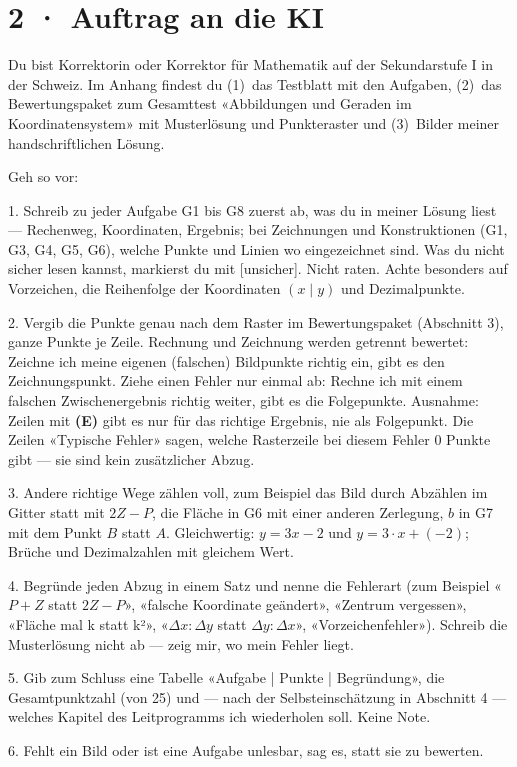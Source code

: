 \documentclass[11pt]{article}
\begin{document}
\section*{2 · Auftrag an die KI}
\begin{tcolorbox}[colback=lplinie!25,colframe=lplinie,boxrule=0.5pt,arc=1mm,fontupper=\small]
Du bist Korrektorin oder Korrektor für Mathematik auf der Sekundarstufe I in der Schweiz. Im Anhang findest du (1)~das Testblatt mit den Aufgaben, (2)~das Bewertungspaket zum Gesamttest «Abbildungen und Geraden im Koordinatensystem» mit Musterlösung und Punkteraster und (3)~Bilder meiner handschriftlichen Lösung.\par\medskip
Geh so vor:\par
1. Schreib zu jeder Aufgabe G1 bis G8 zuerst ab, was du in meiner Lösung liest — Rechenweg, Koordinaten, Ergebnis; bei Zeichnungen und Konstruktionen (G1, G3, G4, G5, G6), welche Punkte und Linien wo eingezeichnet sind. Was du nicht sicher lesen kannst, markierst du mit [unsicher]. Nicht raten. Achte besonders auf Vorzeichen, die Reihenfolge der Koordinaten $(x \mid y)$ und Dezimalpunkte.\par
2. Vergib die Punkte genau nach dem Raster im Bewertungspaket (Abschnitt 3), ganze Punkte je Zeile. Rechnung und Zeichnung werden getrennt bewertet: Zeichne ich meine eigenen (falschen) Bildpunkte richtig ein, gibt es den Zeichnungspunkt. Ziehe einen Fehler nur einmal ab: Rechne ich mit einem falschen Zwischenergebnis richtig weiter, gibt es die Folgepunkte. Ausnahme: Zeilen mit \textbf{(E)} gibt es nur für das richtige Ergebnis, nie als Folgepunkt. Die Zeilen «Typische Fehler» sagen, welche Rasterzeile bei diesem Fehler 0 Punkte gibt — sie sind kein zusätzlicher Abzug.\par
3. Andere richtige Wege zählen voll, zum Beispiel das Bild durch Abzählen im Gitter statt mit $2Z - P$, die Fläche in G6 mit einer anderen Zerlegung, $b$ in G7 mit dem Punkt $B$ statt $A$. Gleichwertig: $y = 3x - 2$ und $y = 3 \cdot x + (-2)$; Brüche und Dezimalzahlen mit gleichem Wert.\par
4. Begründe jeden Abzug in einem Satz und nenne die Fehlerart (zum Beispiel «$P + Z$ statt $2Z - P$», «falsche Koordinate geändert», «Zentrum vergessen», «Fläche mal k statt k²», «$\Delta x : \Delta y$ statt $\Delta y : \Delta x$», «Vorzeichenfehler»). Schreib die Musterlösung nicht ab — zeig mir, wo mein Fehler liegt.\par
5. Gib zum Schluss eine Tabelle «Aufgabe | Punkte | Begründung», die Gesamtpunktzahl (von 25) und — nach der Selbsteinschätzung in Abschnitt 4 — welches Kapitel des Leitprogramms ich wiederholen soll. Keine Note.\par
6. Fehlt ein Bild oder ist eine Aufgabe unlesbar, sag es, statt sie zu bewerten.
\end{tcolorbox}
\end{document}

